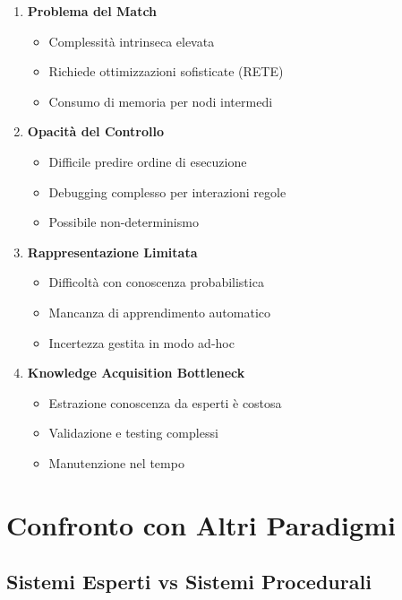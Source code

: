 \begin{enumerate}
\item \textbf{Problema del Match}
\begin{itemize}
\item Complessità intrinseca elevata
\item Richiede ottimizzazioni sofisticate (RETE)
\item Consumo di memoria per nodi intermedi
\end{itemize}

\item \textbf{Opacità del Controllo}
\begin{itemize}
\item Difficile predire ordine di esecuzione
\item Debugging complesso per interazioni regole
\item Possibile non-determinismo
\end{itemize}

\item \textbf{Rappresentazione Limitata}
\begin{itemize}
\item Difficoltà con conoscenza probabilistica
\item Mancanza di apprendimento automatico
\item Incertezza gestita in modo ad-hoc
\end{itemize}

\item \textbf{Knowledge Acquisition Bottleneck}
\begin{itemize}
\item Estrazione conoscenza da esperti è costosa
\item Validazione e testing complessi
\item Manutenzione nel tempo
\end{itemize}
\end{enumerate}

\section{Confronto con Altri Paradigmi}

\subsection{Sistemi Esperti vs Sistemi Procedurali}

